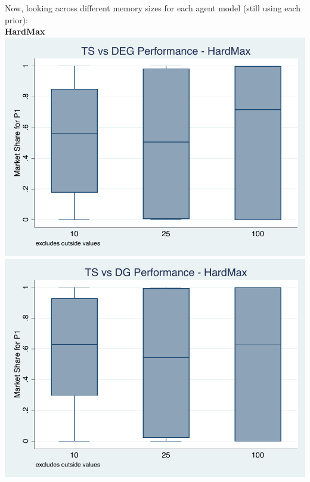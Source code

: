 \documentclass[11pt,letterpaper]{article}
\begin{document}
Now, looking across different memory sizes for each agent model (still using each prior): \\
\textbf{HardMax} \\
\includegraphics[scale=0.75]{hm_ts_deg} \\
\includegraphics[scale=0.75]{hm_ts_dg} \\
\end{document}
